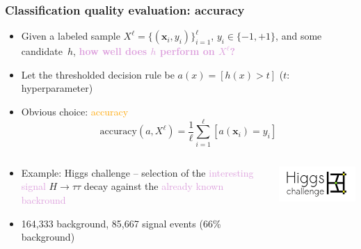 \documentclass[usenames,dvipsnames,aspectratio=169]{beamer}
\begin{document}
\begin{frame}
\frametitle{Classification quality evaluation: accuracy}

\begin{itemize}
\item Given a labeled sample $X^{\ell} = 
    \big\{(\mathbf{x}_i, y_i)\big\}_{i=1}^{\ell}$,
    $y_i \in \{-1, +1\}$,
and some candidate~$h$, \textbf{\textcolor{Plum}{how well
does $h$ perform on $X^\ell$?}}

\pause
\item Let the thresholded decision rule be $a(x) = [h(x) > t]$
($t$: hyperparameter)

\pause
\item Obvious choice: \textcolor{orange}{accuracy}
\[
    \text{accuracy}(a, X^\ell)
    =
    \frac{1}{\ell}
    \sum\limits_{i = 1}^{\ell} [a(\mathbf{x}_i) = y_i]
\]

\end{itemize}

\begin{columns}
    \vspace{-5mm}
    \begin{column}{0.75\textwidth}
    \begin{itemize}
        \item Example: Higgs challenge -- 
        selection of the \textcolor{Plum}{interesting signal} 
        $H \to \tau \tau$ 
        decay against the \textcolor{Plum}{already known backround}

        \item 164,333 background, 85,667 signal events (66\% background)
    \end{itemize}
    \end{column}
    \begin{column}{0.25\textwidth}
    \includegraphics[width=0.9\columnwidth]{higgs_challenge.png}
    \end{column}
\end{columns}

\end{frame}
\end{document}
